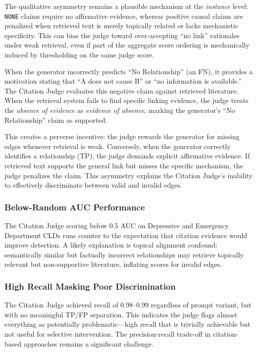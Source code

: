 The qualitative asymmetry remains a plausible mechanism at the \textit{instance} level: \texttt{NONE} claims require no affirmative evidence, whereas positive causal claims are penalized when retrieved text is merely topically related or lacks mechanistic specificity. This can bias the judge toward over-accepting ``no link'' rationales under weak retrieval, even if part of the aggregate score ordering is mechanically induced by thresholding on the same judge score.

When the generator incorrectly predicts ``No Relationship'' (an FN), it provides a motivation stating that ``A does not cause B'' or ``no information is available.'' The Citation Judge evaluates this negative claim against retrieved literature. When the retrieval system fails to find specific linking evidence, the judge treats the \textit{absence of evidence} as \textit{evidence of absence}, marking the generator's ``No Relationship'' claim as supported.

This creates a perverse incentive: the judge rewards the generator for missing edges whenever retrieval is weak. Conversely, when the generator correctly identifies a relationship (TP), the judge demands explicit affirmative evidence. If retrieved text supports the general link but misses the specific mechanism, the judge penalizes the claim. This asymmetry explains the Citation Judge's inability to effectively discriminate between valid and invalid edges.

\subsubsection{Below-Random AUC Performance}

The Citation Judge scoring below 0.5 AUC on Depressive and Emergency Department CLDs runs counter to the expectation that citation evidence would improve detection. A likely explanation is topical alignment confound: semantically similar but factually incorrect relationships may retrieve topically relevant but non-supportive literature, inflating scores for invalid edges.

\subsubsection{High Recall Masking Poor Discrimination}

The Citation Judge achieved recall of 0.98--0.99 regardless of prompt variant, but with no meaningful TP/FP separation. This indicates the judge flags almost everything as potentially problematic---high recall that is trivially achievable but not useful for selective intervention. The precision-recall trade-off in citation-based approaches remains a significant challenge.

